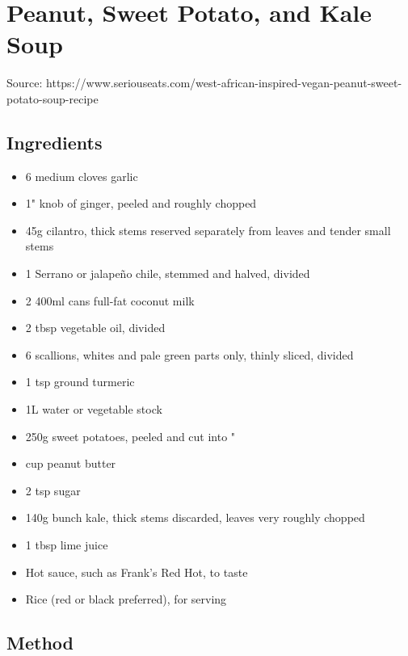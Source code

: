 \clearpage
\section{Peanut, Sweet Potato, and Kale Soup}


Source: https://www.seriouseats.com/west-african-inspired-vegan-peanut-sweet-potato-soup-recipe

\subsection{Ingredients}

\begin{itemize}
    \item 6 medium cloves garlic
    \item 1" knob of ginger, peeled and roughly chopped
    \item 45g cilantro, thick stems reserved separately from leaves and tender small stems
    \item 1 Serrano or jalapeño chile, stemmed and halved, divided
    \item 2 400ml cans full-fat coconut milk
    \item 2 tbsp vegetable oil, divided
    \item 6 scallions, whites and pale green parts only, thinly sliced, divided
    \item 1 tsp ground turmeric
    \item 1L water or vegetable stock
    \item 250g sweet potatoes, peeled and cut into "
    \item {} cup peanut butter
    \item 2 tsp sugar
    \item 140g bunch kale, thick stems discarded, leaves very roughly chopped
    \item 1 tbsp lime juice
    \item Hot sauce, such as Frank's Red Hot, to taste
    \item Rice (red or black preferred), for serving
\end{itemize}

\subsection{Method}

